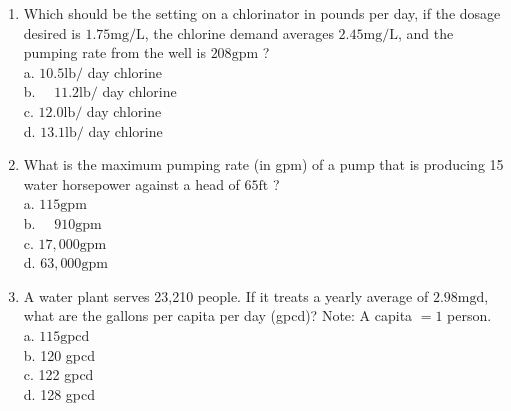 \documentclass[10pt]{article}
\begin{document}
\begin{enumerate}
  \item Which should be the setting on a chlorinator in pounds per day, if the dosage desired is $1.75 \mathrm{mg} / \mathrm{L}$, the chlorine demand averages $2.45 \mathrm{mg} / \mathrm{L}$, and the pumping rate from the well is $208 \mathrm{gpm}$ ?\\
a. $10.5 \mathrm{lb} /$ day chlorine\\
b. $\quad 11.2 \mathrm{lb} /$ day chlorine\\
c. $12.0 \mathrm{lb} /$ day chlorine\\
d. $13.1 \mathrm{lb} /$ day chlorine

  \item What is the maximum pumping rate (in gpm) of a pump that is producing 15 water horsepower against a head of $65 \mathrm{ft}$ ?\\
a. $115 \mathrm{gpm}$\\
b. $\quad 910 \mathrm{gpm}$\\
c. $17,000 \mathrm{gpm}$\\
d. $63,000 \mathrm{gpm}$

  \item A water plant serves 23,210 people. If it treats a yearly average of $2.98 \mathrm{mgd}$, what are the gallons per capita per day (gpcd)? Note: A capita $=1$ person.\\
a. $115 \mathrm{gpcd}$\\
b. 120 gpcd\\
c. 122 gpcd\\
d. 128 gpcd


\end{enumerate}
\end{document}

